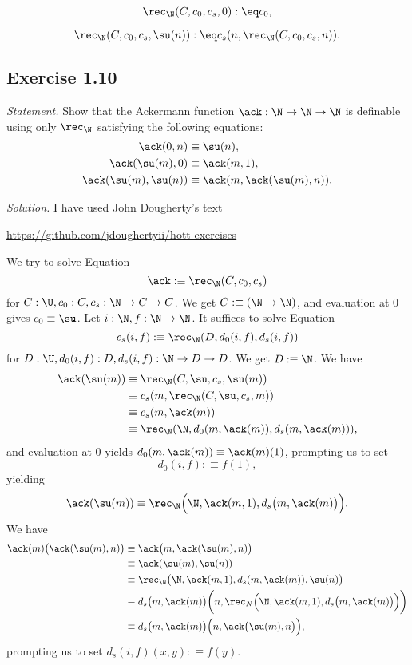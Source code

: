\documentclass[12pt]{article}
\begin{document}
$$\rec_\N(C,c_0,c_s,0):\eq c_0,$$

$$\rec_\N(C,c_0,c_s,\su(n)):\eq c_s(n,\rec_\N(C,c_0,c_s,n)).$$


\subsection{Exercise 1.10}

\emph{Statement.} Show that the Ackermann function $\ack :\N\to\N\to\N$ is definable using only $\rec_\N$ satisfying the following equations:
\begin{align*}
\ack(0,n)&\equiv\su(n),\\
\ack(\su(m),0)&\equiv\ack(m,1),\\
\ack(\su(m),\su(n))&\equiv\ack(m,\ack(\su(m),n)).
\end{align*}

\nn\emph{Solution.} I have used John Dougherty's text 

\nn\href{https://github.com/jdoughertyii/hott-exercises}{https://github.com/jdoughertyii/hott-exercises}

We try to solve Equation 
\begin{equation}\label{ack1}
\ack:\equiv\rec_\N(C,c_0,c_s)
\end{equation}
for $C:\U,c_0:C,c_s:\N\to C\to C$. We get $C:\equiv(\N\to\N)$, and evaluation at 0 gives $c_0\equiv\su$. Let $i:\N,f:\N\to\N$. It suffices to solve Equation 
\begin{equation}\label{ack2}
c_s(i,f):\equiv\rec_\N(D,d_0(i,f),d_s(i,f))
\end{equation}
for $D:\U,d_0(i,f):D,d_s(i,f):\N\to D\to D$. We get $D:\equiv\N$. We have
\begin{align*}
\ack(\su(m))&\equiv\rec_\N(C,\su,c_s,\su(m))\\
&\equiv c_s(m,\rec_\N(C,\su,c_s,m))\\
&\equiv c_s(m,\ack(m))\\
&\equiv\rec_\N(\N,d_0(m,\ack(m)),d_s(m,\ack(m))),
\end{align*}
and evaluation at 0 yields $d_0(m,\ack(m))\equiv\ack(m)(1)$, prompting us to set 
$$
d_0(i,f):\equiv f(1),
$$ 
yielding 
$$
\ack(\su(m))\equiv\rec_\N\Big(\N,\ack(m,1),d_s\big(m,\ack(m)\big)\Big).
$$
We have 
\begin{align*}
\ack(m)\big(\ack(\su(m),n)\big)&\equiv\ack\big(m,\ack(\su(m),n)\big)\\ 
&\equiv\ack(\su(m),\su(n))\\ 
&\equiv\rec_\N\big(\N,\ack(m,1),d_s(m,\ack(m)),\su(n)\big)\\
&\equiv d_s\big(m,\ack(m)\big)\bigg(n,\rec_N\Big(\N,\ack(m,1),d_s\big(m,\ack(m)\big)\Big)\bigg)\\
&\equiv d_s\big(m,\ack(m)\big)\Big(n,\ack\big(\su(m),n\big)\Big),
\end{align*}
prompting us to set $d_s(i,f)(x,y):\equiv f(y)$. 
\end{document}
